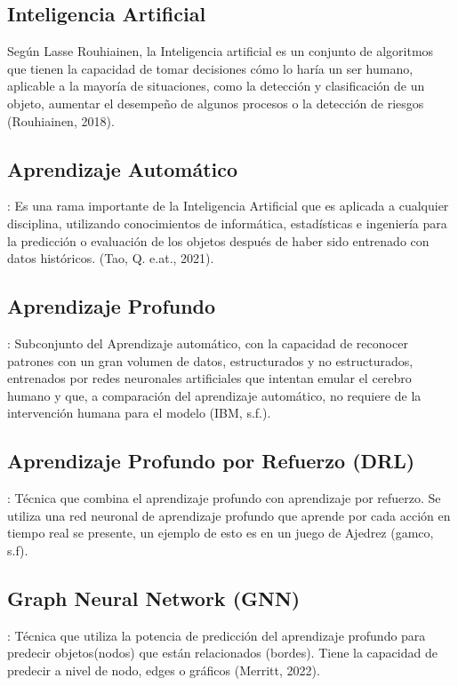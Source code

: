 \subsection{Inteligencia Artificial} Según Lasse Rouhiainen, la Inteligencia artificial es un conjunto de algoritmos que tienen la capacidad de tomar decisiones cómo lo haría un ser humano, aplicable a la mayoría de situaciones, como la detección y clasificación de un objeto, aumentar el desempeño de algunos procesos o la detección de riesgos (Rouhiainen, 2018).

\subsection{Aprendizaje Automático}: Es una rama importante de la Inteligencia Artificial que es aplicada a cualquier disciplina, utilizando conocimientos de informática, estadísticas e ingeniería para la predicción o evaluación de los objetos después de haber sido entrenado con datos históricos. (Tao, Q. e.at., 2021).

\subsection{Aprendizaje Profundo}: Subconjunto del Aprendizaje automático, con la capacidad de reconocer patrones con un gran volumen de datos, estructurados y no estructurados, entrenados por redes neuronales artificiales que intentan emular el cerebro humano y que, a comparación del aprendizaje automático, no requiere de la intervención humana para el modelo (IBM, s.f.).

\subsection{Aprendizaje Profundo por Refuerzo (DRL)}: Técnica que combina el aprendizaje profundo con aprendizaje por refuerzo. Se utiliza una red neuronal de aprendizaje profundo que aprende por cada acción en tiempo real se presente, un ejemplo de esto es en un juego de Ajedrez (gamco, s.f).

\subsection{Graph Neural Network (GNN)}:  Técnica que utiliza la potencia de predicción del aprendizaje profundo para predecir objetos(nodos) que están relacionados (bordes). Tiene la capacidad de predecir a nivel de nodo, edges o gráficos (Merritt, 2022).

